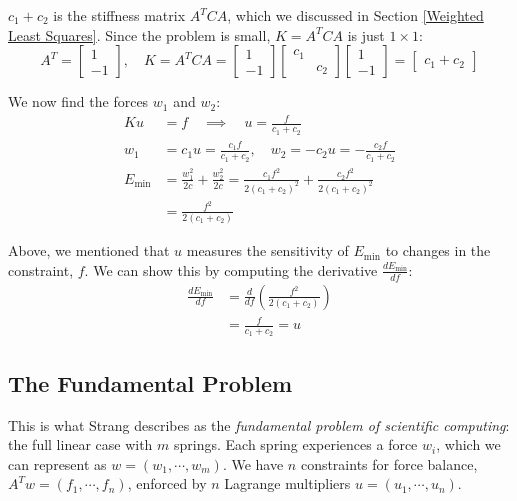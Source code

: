 \documentclass[]{article}
\begin{document}
$c_1 + c_2$ is the stiffness matrix $A^T C A$, which we discussed in Section \ref{Weighted Least Squares}. Since the problem is small, $K = A^T C A$ is just $1 \times 1$: 
\begin{equation*}
A^T = \begin{bmatrix}
1 \\ -1
\end{bmatrix}, \quad K = A^T C A = \begin{bmatrix}
1 \\ -1
\end{bmatrix}\begin{bmatrix}
c_1 & \\ & c_2 
\end{bmatrix} \begin{bmatrix}
1 \\ -1 
\end{bmatrix} = \begin{bmatrix}
c_1 + c_2
\end{bmatrix}
\end{equation*}

We now find the forces $w_1$ and $w_2$:
\begin{align*}
Ku &= f \quad \implies \quad u = \frac{f}{c_{1} + c_{2}} \\
w_1 &= c_1 u = \frac{c_1 f}{c_1 + c_2}, \quad w_2 = -c_2 u = -\frac{c_2 f}{c_1 + c_2} \\ 
E_{\textrm{min}} &= \frac{w_{1}^2}{2c} + \frac{w_{2}^2}{2c} = \frac{c_1 f^2}{2 (c_1 + c_2)^2} + \frac{c_2 f^2}{2 (c_1 + c_2)^2} \\
 &= \frac{f^2}{2 (c_1 + c_2)}
\end{align*}

Above, we mentioned that $u$ measures the sensitivity of $E_{\textrm{min}}$ to changes in the constraint, $f$. We can show this by computing the derivative $\frac{dE_{\textrm{min}}}{df}$:
\begin{align}
\frac{dE_{\textrm{min}}}{df} &= \frac{d}{df} \left(\frac{f^2}{2 (c_1 + c_2)}\right) \nonumber \\
&= \frac{f}{c_1 + c_2} = u
\end{align}

\subsection{The Fundamental Problem}
This is what Strang describes as the \textit{fundamental problem of scientific computing}: the full linear case with $m$ springs. Each spring experiences a force $w_i$, which we can represent as $w = (w_1, \dotsm, w_m)$. We have $n$ constraints for force balance, $A^{T}w = (f_1, \dotsm, f_n)$, enforced by $n$ Lagrange multipliers $u = (u_1, \dotsm, u_n)$.
\end{document}
